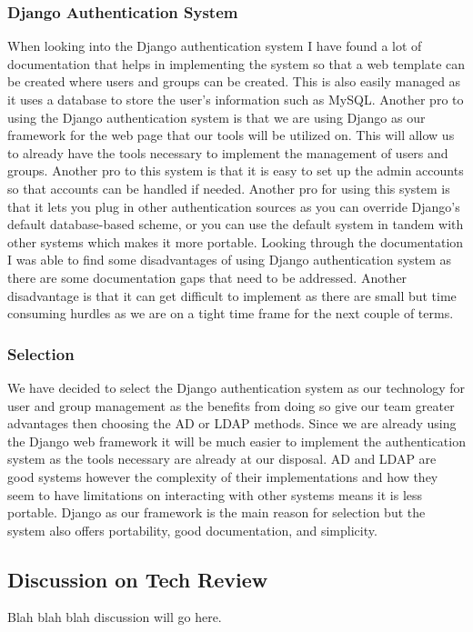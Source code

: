 \documentclass[draftclsnofoot,10pt,onecolumn]{IEEEtran} %
\begin{document}
\subsubsection{Django Authentication System}
When looking into the Django authentication system I have found a lot of documentation that helps in implementing the
system so that a web template can be created where users and groups can be created. This is also easily managed as it uses a
database to store the user’s information such as MySQL. Another pro to using the Django authentication system is that we
are using Django as our framework for the web page that our tools will be utilized on. This will allow us to already have the
tools necessary to implement the management of users and groups. Another pro to this system is that it is easy to set up the
admin accounts so that accounts can be handled if needed. Another pro for using this system is that it lets you plug in other
authentication sources as you can override Django’s default database-based scheme, or you can use the default system in
tandem with other systems which makes it more portable. Looking through the documentation I was able to find some
disadvantages of using Django authentication system as there are some documentation gaps that need to be addressed.
Another disadvantage is that it can get difficult to implement as there are small but time consuming hurdles as we are on a
tight time frame for the next couple of terms. \\

\subsubsection{Selection}
We have decided to select the Django authentication system as our technology for user and group management as the benefits
from doing so give our team greater advantages then choosing the AD or LDAP methods. Since we are already using the
Django web framework it will be much easier to implement the authentication system as the tools necessary are already at
our disposal. AD and LDAP are good systems however the complexity of their implementations and how they seem to have
limitations on interacting with other systems means it is less portable. Django as our framework is the main reason for
selection but the system also offers portability, good documentation, and simplicity. \\

\subsection{Discussion on Tech Review}
Blah blah blah discussion will go here.
\end{document}
